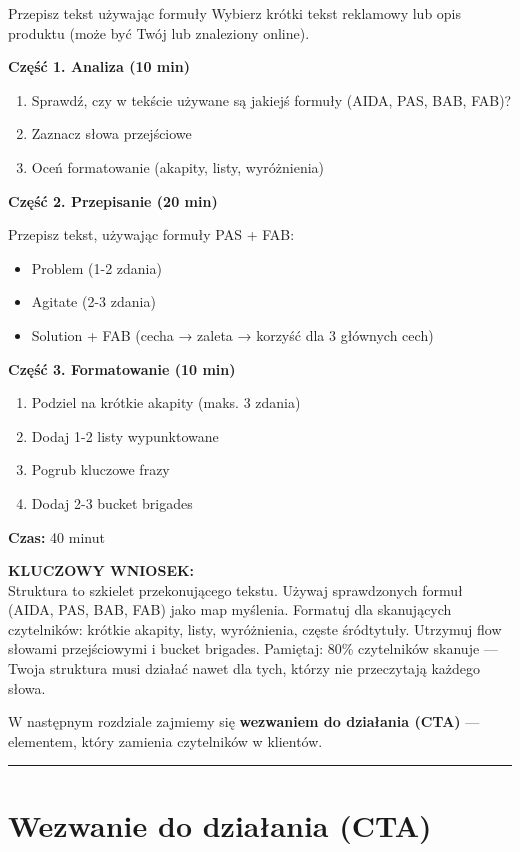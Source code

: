 \documentclass[
  12pt,
  a4paper,
  twoside,
  openright,
  12pt,
  DIV=12,
  BCOR=12mm]{scrbook}
\newcommand{\decoline}{%
  \begin{center}
    \textcolor{bordergray}{\rule{0.3\textwidth}{0.5pt}}
  \end{center}
}
\newcommand{\takeaway}[1]{%
  \begin{tcolorbox}[
    enhanced,
    colback=accentgreen!10,
    colframe=accentgreen,
    boxrule=0pt,
    borderline south={3pt}{0pt}{accentgreen},
    sharp corners,
    left=15pt, right=15pt, top=10pt, bottom=10pt
  ]
    \textbf{\color{accentgreen}KLUCZOWY WNIOSEK:}\\[5pt]
    #1
  \end{tcolorbox}
}
\begin{document}
\begin{cwiczenie}{Przepisz tekst używając formuły}
Wybierz krótki tekst reklamowy lub opis produktu (może być Twój lub znaleziony online).

\textbf{Część 1. Analiza (10 min)}
\begin{enumerate}
  \item Sprawdź, czy w tekście używane są jakiejś formuły (AIDA, PAS, BAB, FAB)?
  \item Zaznacz słowa przejściowe
  \item Oceń formatowanie (akapity, listy, wyróżnienia)
\end{enumerate}

\textbf{Część 2. Przepisanie (20 min)}

Przepisz tekst, używając formuły PAS + FAB:
\begin{itemize}
  \item Problem (1-2 zdania)
  \item Agitate (2-3 zdania)
  \item Solution + FAB (cecha → zaleta → korzyść dla 3 głównych cech)
\end{itemize}

\textbf{Część 3. Formatowanie (10 min)}
\begin{enumerate}
  \item Podziel na krótkie akapity (maks. 3 zdania)
  \item Dodaj 1-2 listy wypunktowane
  \item Pogrub kluczowe frazy
  \item Dodaj 2-3 bucket brigades
\end{enumerate}

\textbf{Czas:} 40 minut
\end{cwiczenie}

\takeaway{Struktura to szkielet przekonującego tekstu. Używaj sprawdzonych formuł (AIDA, PAS, BAB, FAB) jako map myślenia. Formatuj dla skanujących czytelników: krótkie akapity, listy, wyróżnienia, częste śródtytuły. Utrzymuj flow słowami przejściowymi i bucket brigades. Pamiętaj: 80\% czytelników skanuje --- Twoja struktura musi działać nawet dla tych, którzy nie przeczytają każdego słowa.}

W następnym rozdziale zajmiemy się \textbf{wezwaniem do działania (CTA)}
--- elementem, który zamienia czytelników w klientów.

\decoline


\chapter{Wezwanie do działania
(CTA)}\label{wezwanie-do-dziaux142ania-cta}
\end{document}
